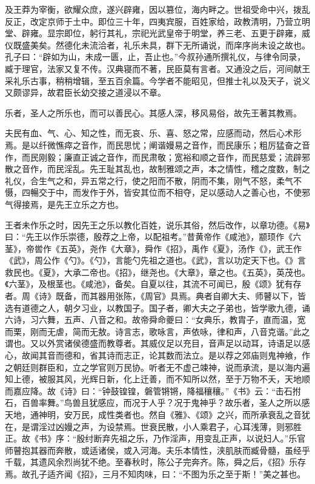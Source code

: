 \documentclass[12pt,UTF8]{ctexbook}
\begin{document}
及王莽为宰衡，欲耀众庶，遂兴辟雍，因以篡位，海内畔之。世祖受命中兴，拨乱反正，改定京师于土中。即位三十年，四夷宾服，百姓家给，政教清明，乃营立明堂、辟雍。显宗即位，躬行其礼，宗祀光武皇帝于明堂，养三老、五更于辟雍，威仪既盛美矣。然德化未流洽者，礼乐未具，群下无所诵说，而庠序尚未设之故也。孔子曰：“辟如为山，未成一匮，止，吾止也。”今叔孙通所撰礼仪，与律令同录，臧于理官，法家又复不传。汉典寝而不著，民臣莫有言者。又通没之后，河间献王采礼乐古事，稍稍增辑，至五百余篇。今学者不能昭见，但推士礼以及天子，说义又颇谬异，故君臣长幼交接之道浸以不章。



乐者，圣人之所乐也，而可以善民心。其感人深，移风易俗，故先王著其教焉。



夫民有血、气、心、知之性，而无哀、乐、喜、怒之常，应感而动，然后心术形焉。是以纤微憔瘁之音作，而民思忧；阐谐嫚易之音作，而民康乐；粗厉猛奋之音作，而民刚毅；廉直正诚之音作，而民肃敬；宽裕和顺之音作，而民慈爱；流辟邪散之音作，而民淫乱。先王耻其乱也，故制雅颂之声，本之情性，稽之度数，制之礼仪，合生气之和，异五常之行，使之阳而不散，阴而不集，刚气不怒，柔气不慑，四暢交于中，而发作于外，皆安其位而不相夺，足以感动人之善心也，不使邪气得接焉，是先王立乐之方也。



王者未作乐之时，因先王之乐以教化百姓，说乐其俗，然后改作，以章功德。《易》曰：“先王以作乐崇德，殷荐之上帝，以配祖考。”昔黄帝作《咸池》，颛顼作《六茎》，帝喾作《五英》，尧作《大章》，舜作《招》，禹作《夏》，汤作《》，武王作《武》，周公作《勺》。《勺》，言能勺先祖之道也。《武》，言以功定天下也。《》言救民也。《夏》，大承二帝也。《招》，继尧也。《大章》，章之也。《五英》，英茂也。《六茎》，及根茎也。《咸池》，备矣。自夏以往，其流不可闻已，殷《颂》犹有存者。周《诗》既备，而其器用张陈，《周官》具焉。典者自卿大夫、师瞽以下，皆选有道德之人，朝夕习业，以教国子。国子者，卿大夫之子弟也，皆学歌九德，诵六诗，习六舞，五声、八音之和。故帝舜命夔曰：“女典乐，教胄子，直而温，宽而栗，刚而无虐，简而无敖。诗言志，歌咏言，声依咏，律和声，八音克谐。”此之谓也。又以外赏诸侯德盛而教尊者。其威仪足以充目，音声足以动耳，诗语足以感心，故闻其音而德和，省其诗而志正，论其数而法立。是以荐之郊庙则鬼神飨，作之朝廷则群臣和，立之学官则万民协。听者无不虚己竦神，说而承流，是以海内遍知上德，被服其风，光辉日新，化上迁善，而不知所以然，至于万物不夭，天地顺而嘉应降。故《诗》曰：“钟鼓锽锽，磐管锵锵，降福穰穰。”《书》云：“击石拊石，百兽率舞。”鸟兽且犹感应，而况于人乎？况于鬼神乎？故乐者，圣人之所以感天地，通神明，安万民，成性类者也。然自《雅》、《颂》之兴，而所承衰乱之音犹在，是谓淫过凶嫚之声，为设禁焉。世衰民散，小人乘君子，心耳浅薄，则邪胜正。故《书》序：“殷纣断弃先祖之乐，乃作淫声，用变乱正声，以说妇人。”乐官师瞽抱其器而奔散，或适诸侯，或入河海。夫乐本情性，浃肌肤而臧骨髓，虽经乎千载，其遗风余烈尚犹不绝。至春秋时，陈公子完奔齐。陈，舜之后，《招》乐存焉。故孔子适齐闻《招》，三月不知肉味，曰：“不图为乐之至于斯！”美之甚也。
\end{document}
